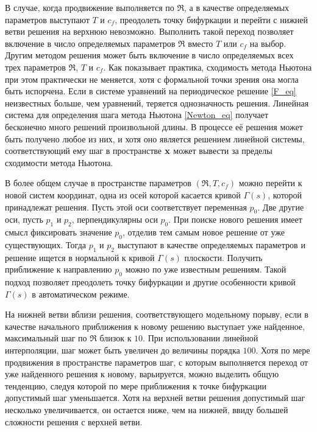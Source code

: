 В случае, когда продвижение выполняется по $\Re$, а в качестве определяемых параметров выступают $T$ и $c_f$, преодолеть точку бифуркации и перейти с нижней ветви решения на верхнюю невозможно. Выполнить такой переход позволяет включение в число определяемых параметров $\Re$ вместо $T$ или $c_f$ на выбор. Другим методом решения может быть включение в число определяемых всех трех параметров $\Re$, $T$ и $c_f$. Как показывает практика, сходимость метода Ньютона при этом практически не меняется, хотя с формальной точки зрения она могла быть испорчена. Если в системе уравнений на периодическое решение \eqref{F_eq} неизвестных больше, чем уравнений, теряется однозначность решения. Линейная система для определения шага метода Ньютона \eqref{Newton_eq} получает бесконечно много решений произвольной длины. В процессе её решения может быть получено любое из них, и хотя оно является решением линейной системы, соответствующий ему шаг в пространстве $\mathbf{x}$ может вывести за пределы сходимости метода Ньютона. 

В более общем случае в пространстве параметров $(\Re, T, c_f)$ можно перейти к новой систем координат, одна из осей которой касается кривой $\Gamma(s)$, которой принадлежат решения. Пусть этой оси соответствует переменная $p_0$. Две другие оси, пусть $p_1$ и $p_2$, перпендикулярны оси $p_0$. При поиске нового решения имеет смысл фиксировать значение $p_0$, отделив тем самым новое решение от уже существующих. Тогда $p_1$ и $p_2$ выступают в качестве определяемых параметров и решение ищется в нормальной к кривой $\Gamma(s)$ плоскости. Получить приближение к направлению $p_0$ можно по уже известным решениям. Такой подход позволяет преодолеть точку бифуркации и другие особенности кривой $\Gamma(s)$ в автоматическом режиме. 

На нижней ветви вблизи решения, соответствующего модельному порыву, если в качестве начального приближения к новому решению выступает уже найденное, максимальный шаг по $\Re$ близок к $10$. При использовании линейной интерполяции, шаг может быть увеличен до величины порядка $100$. Хотя по мере продвижения в пространстве параметров шаг, с которым выполняется переход от уже найденного решения к новому, варьируется, можно выделить общую тенденцию, следуя которой по мере приближения к точке бифуркации допустимый шаг уменьшается. Хотя на верхней ветви решения допустимый шаг несколько увеличивается, он остается ниже, чем на нижней, ввиду большей сложности решения с верхней ветви. 
 






